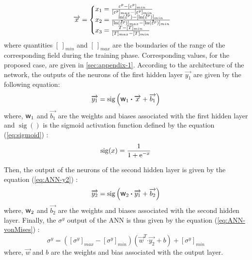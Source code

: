 \documentclass[preprint,12pt,times]{elsarticle}
\newcommand{\e}[1]{\mbox{\ensuremath{\mathrm{e}^{#1}}}}
\DeclareMathOperator{\sigmoid}{sig}
\newcommand{\dotp}{\boldsymbol{\cdot}}
\newcommand{\w}{\mbox{\large\ensuremath{\mathsf{w}}}}
\newcommand{\mdot}[1]{\accentset{\mbox{\bfseries .}}{#1}} %
\begin{document}
\begin{equation}
\overrightarrow{x} =
\begin{cases}
x_1 = \frac{\varepsilon^p - [\varepsilon^p]_{min}}{[\varepsilon^p]_{max} - [\varepsilon^p]_{min}}\\
x_2 = \frac{\ln(\mdot{\varepsilon}^p)-[\ln(\mdot{\varepsilon}^p)]_{min}}{[\ln(\mdot{\varepsilon}^p)]_{max}-[\ln(\mdot{\varepsilon}^p)]_{min}}\label{eq:ANN-preprocess}\\
x_3 = \frac{T-[T]_{min}}{[T]_{max}-[T]_{min}}
\end{cases}
\end{equation}
where quantities $[\ ]_{min}$ and $[\ ]_{max}$  are the boundaries of the range of the corresponding field during the training phase. Corresponding values, for the proposed case, are given in \ref{sec:appendix-1}.
According to the architecture of the network, the outputs of the neurons of the first hidden layer $\overrightarrow{y_1}$ are given by the following equation:
\begin{equation}
\overrightarrow{y_1} = \sigmoid\left(\w_1 \dotp \overrightarrow{x}+ \overrightarrow{b_1}\right)\label{eq:ANN-y1}
\end{equation}
where, $\w_1$ and $\overrightarrow{b_1}$ are the weights and biases associated with the first hidden layer and $\sigmoid()$ is the sigmoid activation function defined by the equation (\ref{eq:sigmoid}) :
\begin{equation}
\sigmoid(x)=\frac{1}{1 + \e{-x}}\label{eq:sigmoid}
\end{equation}

Then, the output of the neurons of the second hidden layer is given by the equation (\ref{eq:ANN-y2}) :
\begin{equation}
\overrightarrow{y_2} = \sigmoid\left(\w_2 \dotp \overrightarrow{y_1}+ \overrightarrow{b_2}\right)\label{eq:ANN-y2}
\end{equation}
where, $\w_2$ and $\overrightarrow{b_2}$ are the weights and biases associated with the second hidden layer.
Finally, the $\sigma^y$ output of the ANN is thus given by the equation (\ref{eq:ANN-vonMises}) :
\begin{equation}
\sigma^y =  \left([\sigma^y]_{max}-[\sigma^y]_{min}\right) \left(\overrightarrow{w}^T \dotp \overrightarrow{y_2} + b\right) + [\sigma^y]_{min} \label{eq:ANN-vonMises}
\end{equation}
where, $\overrightarrow{w}$ and $b$ are the weights and bias associated with the output layer. 
\end{document}
